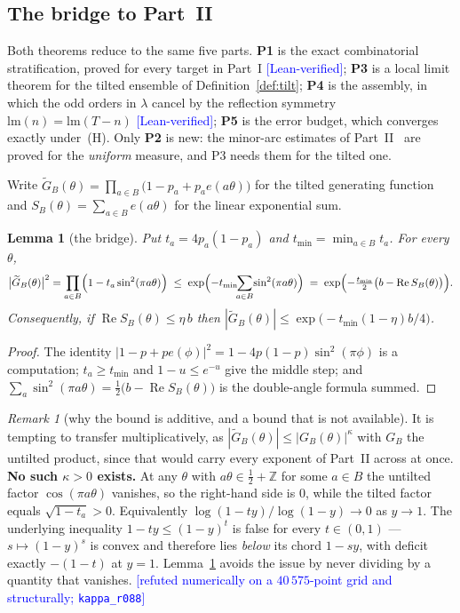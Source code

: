 \documentclass[11pt,a4paper]{article}
\theoremstyle{plain}
\newtheorem{lemma}[theorem]{Lemma}
\theoremstyle{definition}
\theoremstyle{remark}
\newtheorem{remark}[theorem]{Remark}
\newcommand{\lm}{\mathrm{lm}}
\newcommand{\STATUS}[1]{\textcolor{blue}{\textsf{[#1]}}}
\begin{document}
\subsection{The bridge to Part~II}\label{sec:bridge}

Both theorems reduce to the same five parts. \textbf{P1} is the exact combinatorial
stratification, proved for every target in Part~I \STATUS{Lean-verified}; \textbf{P3} is a
local limit theorem for the tilted ensemble of Definition~\ref{def:tilt}; \textbf{P4} is the
assembly, in which the odd orders in $\lambda$ cancel by the reflection symmetry
$\lm(n)=\lm(T-n)$ \STATUS{Lean-verified}; \textbf{P5} is the error budget, which converges
exactly under~(H). Only \textbf{P2} is new: the minor-arc estimates of Part~II~\cite{P2} are proved for
the \emph{uniform} measure, and P3 needs them for the tilted one.

Write $\widetilde G_B(\theta)=\prod_{a\in B}\bigl(1-p_a+p_ae(a\theta)\bigr)$ for the tilted
generating function and $S_B(\theta)=\sum_{a\in B}e(a\theta)$ for the linear exponential sum.

\begin{lemma}[the bridge]\label{lem:kappa}
Put $t_a=4p_a(1-p_a)$ and $t_{\min}=\min_{a\in B}t_a$. For every $\theta$,
\[
  \bigl|\widetilde G_B(\theta)\bigr|^{2}
  =\prod_{a\in B}\Bigl(1-t_a\sin^{2}(\pi a\theta)\Bigr)
  \;\le\;\exp\Bigl(-t_{\min}\!\!\sum_{a\in B}\!\sin^{2}(\pi a\theta)\Bigr)
  \;=\;\exp\Bigl(-\tfrac{t_{\min}}{2}\bigl(b-\operatorname{Re}S_B(\theta)\bigr)\Bigr).
\]
Consequently, if $\operatorname{Re}S_B(\theta)\le\eta\,b$ then
$|\widetilde G_B(\theta)|\le\exp\bigl(-t_{\min}(1-\eta)b/4\bigr)$.
\end{lemma}

\begin{proof}
The identity $|1-p+pe(\phi)|^{2}=1-4p(1-p)\sin^{2}(\pi\phi)$ is a computation;
$t_a\ge t_{\min}$ and $1-u\le e^{-u}$ give the middle step; and
$\sum_a\sin^{2}(\pi a\theta)=\tfrac12\bigl(b-\operatorname{Re}S_B(\theta)\bigr)$ is the
double-angle formula summed.
\end{proof}

\begin{remark}[why the bound is additive, and a bound that is not available]\label{rem:noKappa}
It is tempting to transfer multiplicatively, as $|\widetilde G_B(\theta)|\le|G_B(\theta)|^{\kappa}$
with $G_B$ the untilted product, since that would carry every exponent of Part~II across at
once. \textbf{No such $\kappa>0$ exists.} At any $\theta$ with $a\theta\in\tfrac12+\mathbb Z$ for
some $a\in B$ the untilted factor $\cos(\pi a\theta)$ vanishes, so the right-hand side is $0$,
while the tilted factor equals $\sqrt{1-t_a}>0$. Equivalently
$\log(1-ty)/\log(1-y)\to0$ as $y\to1$. The underlying inequality
$1-ty\le(1-y)^{t}$ is false for every $t\in(0,1)$ --- $s\mapsto(1-y)^{s}$ is convex and
therefore lies \emph{below} its chord $1-sy$, with deficit exactly $-(1-t)$ at $y=1$.
Lemma~\ref{lem:kappa} avoids the issue by never dividing by a quantity that vanishes.
\STATUS{refuted numerically on a $40\,575$-point grid and structurally; \texttt{kappa\_r088}}
\end{remark}
\end{document}
